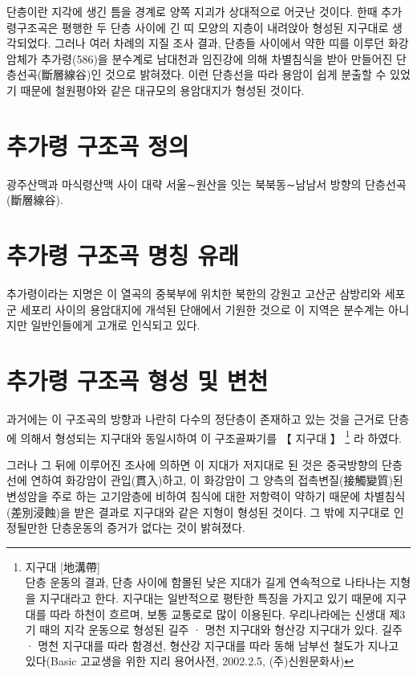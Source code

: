 \documentclass[12pt,a4paper]{book}
\newcommand{\SectionMargin}			{\newpage  \null \vskip 0cm}
\begin{document}
			단층이란 지각에 생긴 틈을 경계로 양쪽 지괴가 상대적으로 어긋난 것이다. 
			한때 추가령구조곡은 평행한 두 단층 사이에 긴 띠 모양의 지층이 내려앉아 형성된 지구대로 생각되었다. 
			그러나 여러 차례의 지질 조사 결과, 단층들 사이에서 약한 띠를 이루던 화강암체가 추가령(586)을 분수계로 
			남대천과 임진강에 의해 차별침식을 받아 만들어진 단층선곡(斷層線谷)인 것으로 밝혀졌다. 
			이런 단층선을 따라 용암이 쉽게 분출할 수 있었기 때문에 철원평야와 같은 대규모의 용암대지가 형성된 것이다.

	\SectionMargin
	\section{추가령 구조곡 정의}

			광주산맥과 마식령산맥 사이 대략 서울∼원산을 잇는 북북동∼남남서 방향의 단층선곡(斷層線谷).



	\SectionMargin
	\section{추가령 구조곡  명칭 유래}

			추가령이라는 지명은 이 열곡의 중북부에 위치한 북한의 강원고 고산군 삼방리와 세포군 세포리 사이의 
			용암대지에 개석된 단애에서 기원한 것으로 이 지역은 분수계는 아니지만 일반인들에게 고개로 인식되고 있다.




	\SectionMargin
	\section{추가령 구조곡  형성 및 변천}

			과거에는 이 구조곡의 방향과 나란히 다수의 정단층이 존재하고 있는 것을 근거로 
			단층에 의해서 형성되는 지구대와 동일시하여 이 구조골짜기를 【 지구대 】
			\footnote{지구대 [地溝帶]\\ 단층 운동의 결과, 단층 사이에 함몰된 낮은 지대가 길게 연속적으로 나타나는 지형을 지구대라고 한다. 지구대는 일반적으로 평탄한 특징을 가지고 있기 때문에 지구대를 따라 하천이 흐르며, 보통 교통로로 많이 이용된다. 우리나라에는 신생대 제3기 때의 지각 운동으로 형성된 길주 · 명천 지구대와 형산강 지구대가 있다. 길주 · 명천 지구대를 따라 함경선, 형산강 지구대를 따라 동해 남부선 철도가 지나고 있다(Basic 고교생을 위한 지리 용어사전, 2002.2.5, (주)신원문화사)} 
			라 하였다.

그러나 그 뒤에 이루어진 조사에 의하면 이 지대가 저지대로 된 것은 중국방향의 단층선에 연하여 화강암이 관입(貫入)하고, 이 화강암이 그 양측의 접촉변질(接觸變質)된 변성암을 주로 하는 고기암층에 비하여 침식에 대한 저항력이 약하기 때문에 차별침식(差別浸蝕)을 받은 결과로 지구대와 같은 지형이 형성된 것이다. 그 밖에 지구대로 인정될만한 단층운동의 증거가 없다는 것이 밝혀졌다. 
\end{document}
